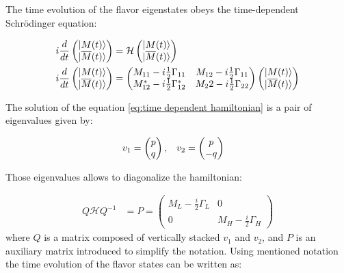 The time evolution of the flavor eigenstates obeys the time-dependent Schr\"{o}dinger equation:

\begin{align}
\label{eq:time dependent hamiltonian}
\centering
    i\frac{d}{dt} \left(\begin{matrix} \ket{M(t)}  \\ \ket{\overline{M}(t)} \end{matrix}  \right) 
    &= \mathcal{H} \left(\begin{matrix} \ket{M(t)}  \\ \ket{\overline{M}(t)} \end{matrix}  \right) \\
    i\frac{d}{dt} \left(\begin{matrix} \ket{M(t)}  \\ \ket{\overline{M}(t)} \end{matrix}  \right) 
    &=\left( \begin{matrix} M_{11} - i\frac{1}{2}\Gamma_{11} & M_{12} -i\frac{1}{2}\Gamma_{11} \\ M_{12}^{*} - i\frac{1}{2}\Gamma_{12}^{*} & M_22-i\frac{1}{2}\Gamma_{22} \end{matrix} \right) \left(\begin{matrix} \ket{M(t)}  \\ \ket{\overline{M}(t)} \end{matrix}  \right) 
\end{align}

The solution of the equation \ref{eq:time dependent hamiltonian} is a pair of eigenvalues given by:

\begin{align}
\centering
    v_{1} &= \left( \begin{matrix} p  \\ q \end{matrix} \right), & 
    v_{2} &=  \left( \begin{matrix} p \\ -q \end{matrix} \right) 
\end{align}

Those eigenvalues allows to diagonalize the hamiltonian: 

\begin{align}
   Q\mathcal{H}Q^{-1} &= P =  \left( \begin{matrix} M_{L} - \frac{i}{2}\Gamma_{L} & 0  \\ 0 &  M_{H} - \frac{i}{2}\Gamma_{H}  \end{matrix} \right) 
\end{align}
where $Q$ is a matrix composed of vertically stacked $v_1$ and $v_2$, and $P$ is an auxiliary matrix introduced to simplify the notation. 
Using mentioned notation the time evolution of the flavor states can be written as:

